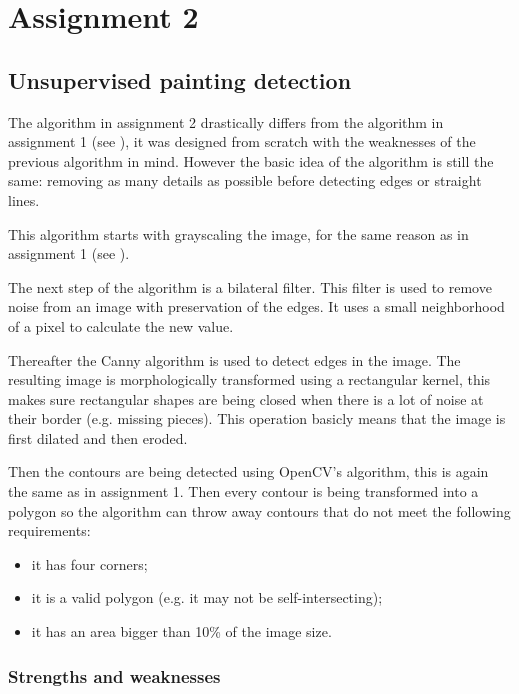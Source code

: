 \chapter{Assignment 2}
\section{Unsupervised painting detection}
\label{sec:unsupervised_painting_detection}
The algorithm in assignment 2 drastically differs from the algorithm in assignment 1 (see ), it was designed from scratch with the weaknesses of the previous algorithm in mind. However the basic idea of the algorithm is still the same: removing as many details as possible before detecting edges or straight lines.


This algorithm starts with grayscaling the image, for the same reason as in assignment 1 (see ).

The next step of the algorithm is a bilateral filter. This filter is used to remove noise from an image with preservation of the edges. It uses a small neighborhood of a pixel to calculate the new value. \cite{BilateralFilter}

Thereafter the Canny algorithm is used to detect edges in the image. The resulting image is morphologically transformed using a rectangular kernel, this makes sure rectangular shapes are being closed when there is a lot of noise at their border (e.g. missing pieces). This operation basicly means that the image is first dilated and then eroded.

Then the contours are being detected using OpenCV's algorithm, this is again the same as in assignment 1. Then every contour is being transformed into a polygon so the algorithm can throw away contours that do not meet the following requirements:

\begin{itemize}
  \item it has four corners;
  \item it is a valid polygon (e.g. it may not be self-intersecting);
  \item it has an area bigger than 10\% of the image size.
\end{itemize}


\subsection{Strengths and weaknesses}

